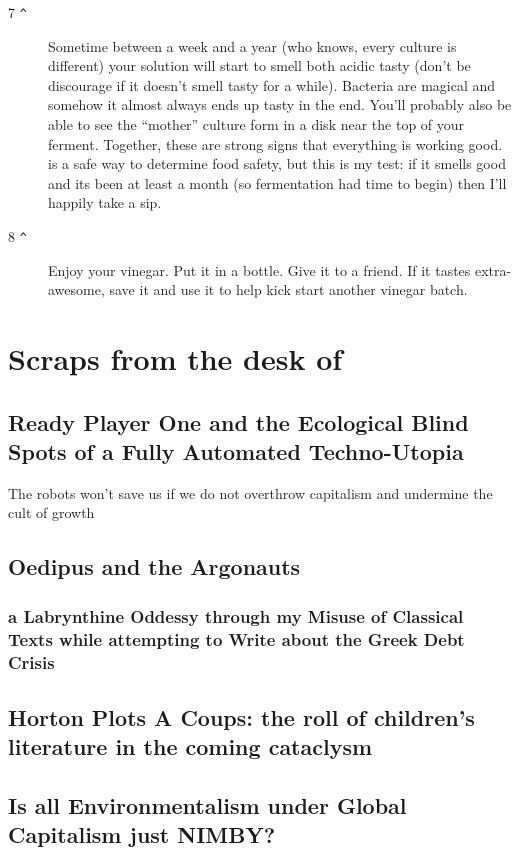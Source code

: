 \documentclass[10pt,a6paper,footinclude=false,firstfoot=false,headinclude=true,open=any,DIV=6]{scrbook} %
\begin{document}
\begin{description}
\item [7 \texttt{\^}] Sometime between a week and a year (who knows, every culture is different) your solution will start to smell both acidic  tasty (don't be discourage if it doesn't smell tasty for a while). Bacteria are magical and somehow it almost always ends up tasty in the end. You'll probably also be able to see the ``mother'' culture form in a disk near the top of your ferment. Together, these are strong signs that everything is working good.  is a safe way to determine food safety, but this is my test: if it smells good and its been at least a month (so fermentation had time to begin) then I'll happily take a sip.
\item [8 \texttt{\^}] Enjoy your vinegar. Put it in a bottle. Give it to a friend. If it tastes extra-awesome, save it and use it to help kick start another vinegar batch.

\end{description}

\chapter{Scraps from the desk of }

\section*{Ready Player One and the Ecological Blind Spots of a Fully Automated Techno-Utopia}

The robots won’t save us if we do not overthrow capitalism and undermine the cult of growth \ellipsis

\section*{Oedipus and the Argonauts}
\subsection*{a Labrynthine Oddessy through my Misuse of Classical Texts while attempting to Write about the Greek Debt Crisis}

\section*{Horton Plots A Coups: the roll of children’s literature in the coming cataclysm}

\section*{Is all Environmentalism under Global Capitalism just NIMBY?}
\end{document}

